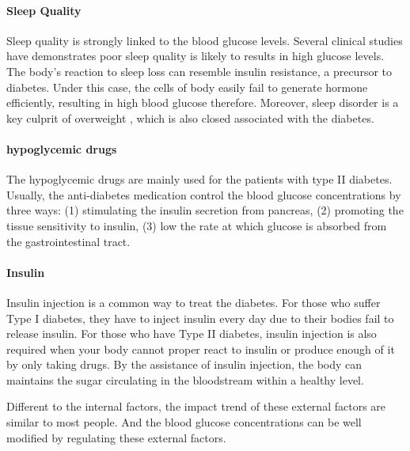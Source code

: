 \paragraph{Sleep Quality} 
Sleep quality is strongly linked to the blood glucose levels. 
Several clinical studies \cite{bib:scheen1998roles,bib:scheen1996relationships,bib:spiegel2005sleep} have demonstrates poor sleep quality is likely to results in high glucose levels. 
The body's reaction to sleep loss can resemble insulin resistance, a precursor to diabetes. 
Under this case, the cells of body easily fail to generate hormone efficiently, resulting in high blood glucose therefore. 
Moreover, sleep disorder is a key culprit of overweight \cite{bib:punjabi2002sleep, bib:knutson2006role}, which is also closed associated with the diabetes.

\paragraph{hypoglycemic drugs} 
The hypoglycemic drugs are mainly used for the patients with type II diabetes\cite{bib:eurich2007benefits,bib:jung2006antidiabetic,bib:patel2012overview}. 
Usually, the anti-diabetes medication control the blood glucose concentrations by three ways: (1) stimulating the insulin secretion from pancreas, (2) promoting the tissue sensitivity to insulin, (3) low the rate at which glucose is absorbed from the gastrointestinal tract.

\paragraph{Insulin} 
Insulin injection is a common way to treat the diabetes. 
For those who suffer Type I diabetes, they have to inject insulin every day due to their bodies fail to release insulin. 
For those who have Type II diabetes, insulin injection is also required when your body cannot proper react to insulin or produce enough of it by only taking drugs. 
By the assistance of insulin injection, the body can maintains the sugar circulating in the bloodstream within a healthy level.

Different to the internal factors, the impact trend of these external factors are similar to most people. 
And the blood glucose concentrations can be well modified by regulating these external factors.
